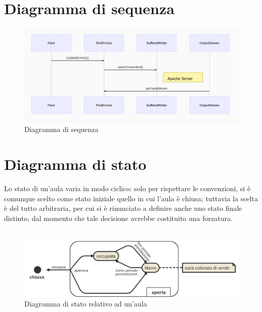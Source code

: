 \documentclass{article}
\begin{document}
	\section{Diagramma di sequenza}
	\begin{figure}[h]
		\includegraphics[width=\textwidth]{seq}
		\centering
		\caption{Diagramma di sequenza}
	\end{figure}
	\newpage
	\section{Diagramma di stato}
	Lo stato di un'aula varia in modo ciclico: solo per rispettare le convenzioni, si è comunque scelto come stato iniziale quello in cui l'aula è chiusa; tuttavia la scelta è del tutto arbitraria, per cui si è rinunciato a definire anche uno stato finale distinto, dal momento che tale decisione avrebbe costituito una forzatura.\\\\
	\begin{figure}[h]
		\includegraphics[width=\textwidth]{stato}
		\centering
		\caption{Diagramma di stato relativo ad un'aula}
	\end{figure}
	\newpage
\end{document}
